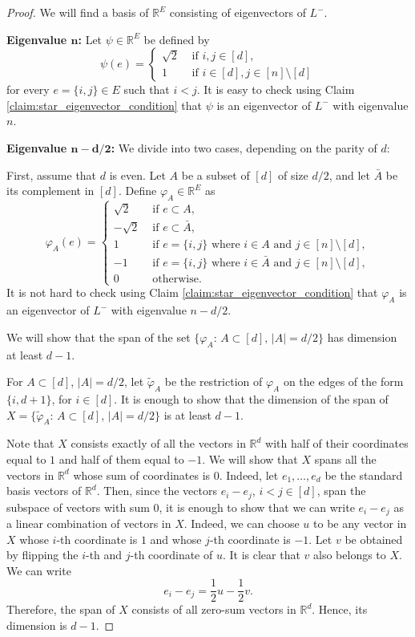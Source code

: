 \documentclass[a4paper,11pt]{article}
\theoremstyle{plain}
\theoremstyle{definition}
\newcommand{\Rea}{{\mathbb R}}
\begin{document}
\begin{proof}
We will find a basis of $\Rea^E$ consisting of eigenvectors of $L^{-}$.

\textbf{Eigenvalue $\bm{n}$:}
Let $\psi\in\Rea^E$ be defined by
\[
    \psi(e)=\begin{cases}
     \sqrt{2} & \text{ if } i,j\in[d],\\
     1 & \text{ if } i\in[d], j\in[n]\setminus[d]
    \end{cases}
\]
for every $e=\{i,j\}\in E$ such that $i<j$. It is easy to check using Claim \ref{claim:star_eigenvector_condition} that $\psi$ is an eigenvector of $L^{-}$ with eigenvalue $n$.




\textbf{Eigenvalue $\bm{n-d/2}$:} 
We divide into two cases, depending on the parity of $d$:

First, assume that $d$ is even. Let $A$ be a subset of $[d]$ of size $d/2$, and let $\bar{A}$ be its complement in $[d]$. Define $\varphi_A\in \Rea^E$ as
\[
    \varphi_A(e)=\begin{cases}
                    \sqrt{2} & \text{ if } e\subset A,\\
                    -\sqrt{2} & \text{ if } e\subset \bar{A},\\
                    1 & \text{ if } e=\{i,j\} \text{ where } i\in A \text{ and } j\in[n]\setminus[d],\\
                    -1 & \text{ if } e=\{i,j\} \text{ where } i\in \bar{A} \text{ and } j\in[n]\setminus[d],\\
                    0 &\text{ otherwise.}
    \end{cases}
\]
It is not hard to check using Claim \ref{claim:star_eigenvector_condition} that $\varphi_A$ is an eigenvector of $L^-$ with eigenvalue $n-d/2$.

We will show that the span of the set $\{\varphi_A:\, A\subset[d],\, |A|=d/2\}$ has dimension at least $d-1$.

For $A\subset [d]$, $|A|=d/2$, let $\tilde{\varphi}_A$ be the restriction of $\varphi_A$ on the edges of the form $\{i,d+1\}$, for $i\in[d]$. It is enough to show that the dimension of the span of $X=\{\tilde{\varphi}_A:\, A\subset[d],\, |A|=d/2\}$ is at least $d-1$. 

Note that $X$ consists exactly of all the vectors in $\Rea^d$ with half of their coordinates equal to $1$ and half of them equal to $-1$.  We will show that $X$ spans all the vectors in $\Rea^d$ whose sum of coordinates is $0$. Indeed, let $e_1,\ldots,e_d$ be the standard basis vectors of $\Rea^d$. Then, since the vectors $e_i-e_j$, $i<j\in[d]$, span the subspace of vectors with sum $0$, it is enough to show that we can write $e_i-e_j$ as a linear combination of vectors in $X$. Indeed, we can choose $u$ to be any vector in $X$ whose $i$-th coordinate is $1$ and whose $j$-th coordinate is $-1$. Let $v$ be obtained by flipping the $i$-th and $j$-th coordinate of $u$. It is clear that $v$ also belongs to $X$. We can write
\[
e_i-e_j=\frac{1}{2}u-\frac{1}{2}v.
\]  
Therefore, the span of $X$ consists of all zero-sum vectors in $\Rea^d$. Hence, its dimension is $d-1$.


\end{proof}
\end{document}
